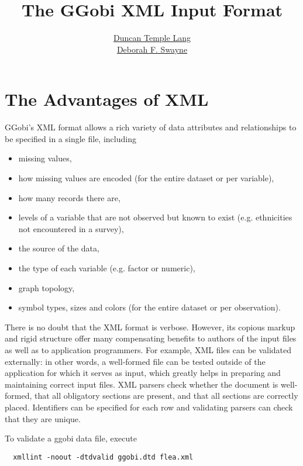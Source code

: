 \documentclass{article}
\title{The GGobi XML Input Format}
\author{\href{http://cm.bell-labs.com/stat/duncan}{Duncan Temple Lang}\\
\href{http://www.research.att.com/~dfs}{Deborah F. Swayne}}
\begin{document}
\maketitle
\section{The Advantages of XML}

GGobi's XML format allows a rich variety of data attributes and
relationships to be specified in a single file, including

\begin{itemize} \itemsep 0em
\item missing values,
\item how missing values
      are encoded (for the entire dataset or per variable),
\item how many records there are, 
\item levels of a variable that are not observed
      but known to exist (e.g. ethnicities not encountered in a survey),
\item the source of the data,
\item the type of each variable (e.g. factor or numeric), 
\item graph topology,
\item symbol types, sizes and colors (for the entire dataset or
      per observation).
\end{itemize}


There is no doubt that the XML format is verbose.  However, its
copious markup and rigid structure offer many compensating benefits to
authors of the input files as well as to application programmers.  For
example, XML files can be validated externally: in other words, a
well-formed file can be tested outside of the application for which it
serves as input, which greatly helps in preparing and maintaining
correct input files.  XML parsers check whether the document is
well-formed, that all obligatory sections are present, and that all
sections are correctly placed.  Identifiers can be specified for each
row and validating parsers can check that they are unique.

To validate a ggobi data file, execute
\begin{verbatim}
  xmllint -noout -dtdvalid ggobi.dtd flea.xml
\end{verbatim}

\end{document}
